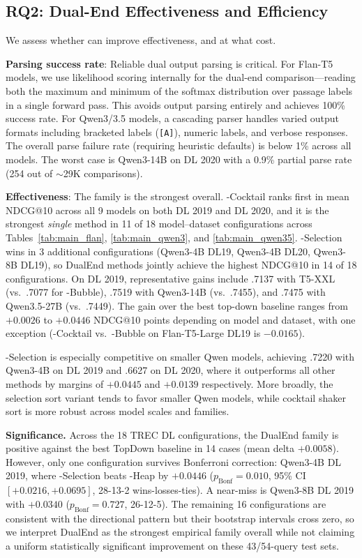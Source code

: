 \subsection{RQ2: Dual-End Effectiveness and Efficiency}
\label{sec:rq2}

We assess whether \dualend{} can improve effectiveness, and at what cost.

\textbf{Parsing success rate}: Reliable dual output parsing is critical. For Flan-T5 models, we use likelihood scoring internally for the dual-end comparison---reading both the maximum and minimum of the softmax distribution over passage labels in a single forward pass. This avoids output parsing entirely and achieves 100\% success rate. For Qwen3/3.5 models, a cascading parser handles varied output formats including bracketed labels (\texttt{[A]}), numeric labels, and verbose responses. The overall parse failure rate (requiring heuristic defaults) is below 1\% across all models. The worst case is Qwen3-14B on DL 2020 with a 0.9\% partial parse rate (254 out of ${\sim}$29K comparisons).

\textbf{Effectiveness}: The \dualend{} family is the strongest overall. \dualend{}-Cocktail ranks first in mean NDCG@10 across all 9 models on both DL 2019 and DL 2020, and it is the strongest \emph{single} method in 11 of 18 model--dataset configurations across Tables~\ref{tab:main_flan}, \ref{tab:main_qwen3}, and \ref{tab:main_qwen35}. \dualend{}-Selection wins in 3 additional configurations (Qwen3-4B DL19, Qwen3-4B DL20, Qwen3-8B DL19), so DualEnd methods jointly achieve the highest NDCG@10 in 14 of 18 configurations. On DL 2019, representative gains include .7137 with T5-XXL (vs.\ .7077 for \topdown{}-Bubble), .7519 with Qwen3-14B (vs.\ .7455), and .7475 with Qwen3.5-27B (vs.\ .7449). The gain over the best top-down baseline ranges from $+0.0026$ to $+0.0446$ NDCG@10 points depending on model and dataset, with one exception (\dualend{}-Cocktail vs.\ \topdown{}-Bubble on Flan-T5-Large DL19 is $-0.0165$).

\dualend{}-Selection is especially competitive on smaller Qwen models, achieving .7220 with Qwen3-4B on DL 2019 and .6627 on DL 2020, where it outperforms all other methods by margins of $+0.0445$ and $+0.0139$ respectively. More broadly, the selection sort variant tends to favor smaller Qwen models, while cocktail shaker sort is more robust across model scales and families.

\textbf{Significance.} Across the 18 TREC DL configurations, the DualEnd family is positive against the best TopDown baseline in 14 cases (mean delta $+0.0058$). However, only one configuration survives Bonferroni correction: Qwen3-4B DL 2019, where \dualend{}-Selection beats \topdown{}-Heap by $+0.0446$ ($p_\text{Bonf}=0.010$, 95\% CI $[+0.0216, +0.0695]$, 28-13-2 wins-losses-ties). A near-miss is Qwen3-8B DL 2019 with $+0.0340$ ($p_\text{Bonf}=0.727$, 26-12-5). The remaining 16 configurations are consistent with the directional pattern but their bootstrap intervals cross zero, so we interpret DualEnd as the strongest empirical family overall while not claiming a uniform statistically significant improvement on these 43/54-query test sets.

